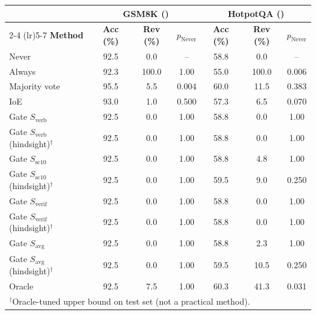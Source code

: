 \begin{tabular}{lcccccc}
\toprule
& \multicolumn{3}{c}{\textbf{GSM8K (\modelA{})}} & \multicolumn{3}{c}{\textbf{HotpotQA (\modelA{})}} \\
\cmidrule(lr){2-4} \cmidrule(lr){5-7}
\textbf{Method} & \textbf{Acc (\%)} & \textbf{Rev (\%)} & \textbf{$p_{\text{Never}}$} & \textbf{Acc (\%)} & \textbf{Rev (\%)} & \textbf{$p_{\text{Never}}$} \\
\midrule
Never & 92.5 & 0.0 & -- & 58.8 & 0.0 & -- \\
Always & 92.3 & 100.0 & 1.00 & 55.0 & 100.0 & 0.006 \\
Majority vote & 95.5 & 5.5 & 0.004 & 60.0 & 11.5 & 0.383 \\
IoE & 93.0 & 1.0 & 0.500 & 57.3 & 6.5 & 0.070 \\
\midrule
Gate $S_{\text{verb}}$ & 92.5 & 0.0 & 1.00 & 58.8 & 0.0 & 1.00 \\
Gate $S_{\text{verb}}$ (hindsight)$^\dagger$ & 92.5 & 0.0 & 1.00 & 58.8 & 0.0 & 1.00 \\
Gate $S_{\text{sc10}}$ & 92.5 & 0.0 & 1.00 & 58.8 & 4.8 & 1.00 \\
Gate $S_{\text{sc10}}$ (hindsight)$^\dagger$ & 92.5 & 0.0 & 1.00 & 59.5 & 9.0 & 0.250 \\
Gate $S_{\text{verif}}$ & 92.5 & 0.0 & 1.00 & 58.8 & 0.0 & 1.00 \\
Gate $S_{\text{verif}}$ (hindsight)$^\dagger$ & 92.5 & 0.0 & 1.00 & 58.8 & 0.0 & 1.00 \\
Gate $S_{\text{avg}}$ & 92.5 & 0.0 & 1.00 & 58.8 & 2.3 & 1.00 \\
Gate $S_{\text{avg}}$ (hindsight)$^\dagger$ & 92.5 & 0.0 & 1.00 & 59.5 & 10.5 & 0.250 \\
\midrule
Oracle & 92.5 & 7.5 & 1.00 & 60.3 & 41.3 & 0.031 \\
\bottomrule
\multicolumn{7}{l}{\footnotesize $^\dagger$Oracle-tuned upper bound on test set (not a practical method).}\\
\end{tabular}
